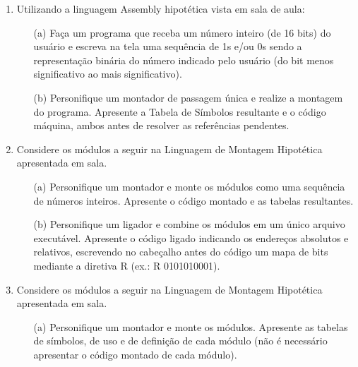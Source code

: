 \begin{enumerate}
    \item
    Utilizando a linguagem Assembly hipotética vista em sala de aula:
    \begin{itemize}
        \item [(a)]
        Faça um programa que receba um número inteiro (de 16 bits) do usuário
        e escreva na tela uma sequência de 1s e/ou 0s 
        sendo a representação binária do número indicado pelo usuário 
        (do bit menos significativo ao mais significativo).

        \item [(b)]
        Personifique um montador de passagem única e realize a montagem do programa.
        Apresente a Tabela de Símbolos resultante e o código máquina,
        ambos antes de resolver as referências pendentes.
    \end{itemize}

    \item
    Considere os módulos a seguir na Linguagem de Montagem Hipotética apresentada em sala.
    \begin{multicols}{2}
        \columnbreak
    \end{multicols}

    \begin{itemize}
        \item [(a)]
        Personifique um montador e monte os módulos como uma sequência de números inteiros. 
        Apresente o código montado e as tabelas resultantes.

        \item [(b)]
        Personifique um ligador e combine os módulos em um único arquivo executável.
        Apresente o código ligado indicando os endereços absolutos e relativos,
        escrevendo no cabeçalho antes do código um mapa de bits mediante a diretiva R
        (ex.: R 0101010001). 
    \end{itemize}

    \item 
    Considere os módulos a seguir na Linguagem de Montagem Hipotética apresentada em sala.
    \begin{multicols}{3}
        \columnbreak
        \columnbreak
    \end{multicols}
    \begin{itemize}
        \item [(a)]
        Personifique um montador e monte os módulos. 
        Apresente as tabelas de símbolos, de uso e de definição de cada módulo
        (não é necessário apresentar o código montado de cada módulo).


\end{itemize}
\end{enumerate}
